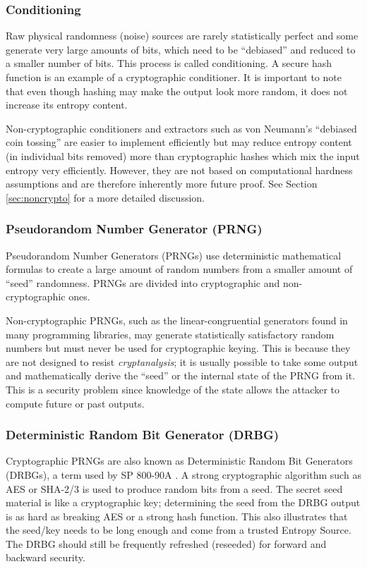     \subsubsection{Conditioning}
    \label{sec:intro-cond}
    Raw physical randomness (noise) sources are rarely statistically
    perfect and some generate very large amounts of bits, which need to be
    ``debiased'' and reduced to a smaller number of bits. This process is
    called conditioning. A secure hash function is an example of a
    cryptographic conditioner. It is important to note that even though
    hashing may make the output look more random, it does not increase its
    entropy content.

    Non-cryptographic conditioners and extractors such as von Neumann's
    ``debiased coin tossing'' \cite{Ne51} are easier to implement
    efficiently but may reduce entropy content (in individual bits removed)
    more than cryptographic hashes which mix the input entropy very efficiently.
    However, they are not based on computational hardness assumptions and
    are therefore inherently more future proof. See Section
    \ref{sec:noncrypto} for a more detailed discussion.

    \subsubsection{Pseudorandom Number Generator (PRNG)}
    \label{sec:intro-prng}
    Pseudorandom Number Generators (PRNGs) use deterministic mathematical
    formulas to create a large amount of random numbers from a smaller
    amount of ``seed'' randomness. PRNGs are divided into cryptographic and
    non-cryptographic ones.

    Non-cryptographic PRNGs, such as the linear-congruential generators
    found in many programming libraries, may generate statistically
    satisfactory random numbers but must never be used for cryptographic
    keying. This is because they are not designed to resist
    \emph{cryptanalysis}; it is usually possible to take some output and
    mathematically derive the ``seed'' or the internal state  of the PRNG
    from it. This is a security problem since knowledge of the state
    allows the attacker to compute future or past outputs.

    \subsubsection{Deterministic Random Bit Generator (DRBG)}
    \label{sec:intro-drbg}
    Cryptographic PRNGs are also known as Deterministic Random Bit
    Generators (DRBGs), a term used by SP 800-90A \cite{BaKe15}. A strong
    cryptographic algorithm such as AES \cite{NI01} or SHA-2/3
    \cite{NI15,NI15A} is used to produce random bits from a seed. The secret
    seed material is like a cryptographic key; determining the seed
    from the DRBG output is as hard as breaking AES or a strong hash function.
    This also illustrates that the seed/key needs to be long enough and
    come from a trusted Entropy Source. The DRBG should still be frequently
    refreshed (reseeded) for forward and backward security.


